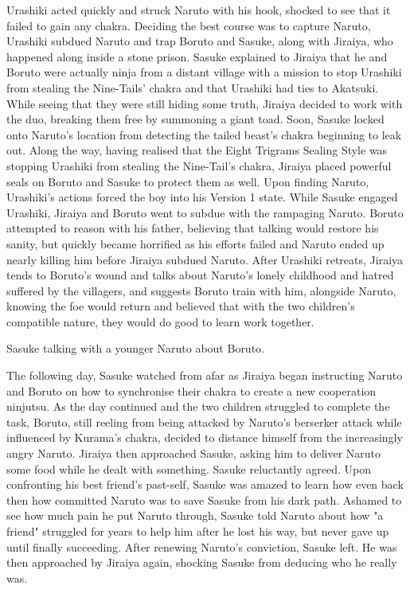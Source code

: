 \documentclass[a4paper,12pt]{article}
\begin{document}
Urashiki acted quickly and struck Naruto with his hook, shocked to see that it failed to gain any chakra. Deciding the best course was to capture Naruto, Urashiki subdued Naruto and trap Boruto and Sasuke, along with Jiraiya, who happened along inside a stone prison. Sasuke explained to Jiraiya that he and Boruto were actually ninja from a distant village with a mission to stop Urashiki from stealing the Nine-Tails' chakra and that Urashiki had ties to Akatsuki. While seeing that they were still hiding some truth, Jiraiya decided to work with the duo, breaking them free by summoning a giant toad. Soon, Sasuke locked onto Naruto's location from detecting the tailed beast's chakra beginning to leak out. Along the way, having realised that the Eight Trigrams Sealing Style was stopping Urashiki from stealing the Nine-Tail's chakra, Jiraiya placed powerful seals on Boruto and Sasuke to protect them as well. Upon finding Naruto, Urashiki's actions forced the boy into his Version 1 state. While Sasuke engaged Urashiki, Jiraiya and Boruto went to subdue with the rampaging Naruto. Boruto attempted to reason with his father, believing that talking would restore his sanity, but quickly became horrified as his efforts failed and Naruto ended up nearly killing him before Jiraiya subdued Naruto. After Urashiki retreats, Jiraiya tends to Boruto's wound and talks about Naruto's lonely childhood and hatred suffered by the villagers, and suggests Boruto train with him, alongside Naruto, knowing the foe would return and believed that with the two children's compatible nature, they would do good to learn work together.\\ \par \vspace{0.5cm}

Sasuke talking with a younger Naruto about Boruto.\\ \par \vspace{0.5cm}

The following day, Sasuke watched from afar as Jiraiya began instructing Naruto and Boruto on how to synchronise their chakra to create a new cooperation ninjutsu. As the day continued and the two children struggled to complete the task, Boruto, still reeling from being attacked by Naruto's berserker attack while influenced by Kurama's chakra, decided to distance himself from the increasingly angry Naruto. Jiraiya then approached Sasuke, asking him to deliver Naruto some food while he dealt with something. Sasuke reluctantly agreed. Upon confronting his best friend's past-self, Sasuke was amazed to learn how even back then how committed Naruto was to save Sasuke from his dark path. Ashamed to see how much pain he put Naruto through, Sasuke told Naruto about how "a friend" struggled for years to help him after he lost his way, but never gave up until finally succeeding. After renewing Naruto's conviction, Sasuke left. He was then approached by Jiraiya again, shocking Sasuke from deducing who he really was.\\ \par \vspace{0.5cm}
\end{document}

